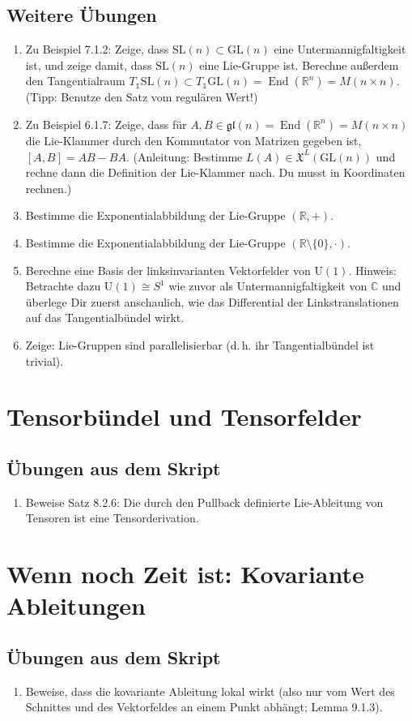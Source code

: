 \documentclass[a4paper,headsepline,headheight=30pt,numbers=enddot]{scrartcl}
\DeclareMathOperator{\End}{End}
\newcommand{\R}{\mathbb{R}}
\newcommand{\vf}{\mathfrak{X}}
\begin{document}
	\subsection*{Weitere Übungen}
	\begin{enumerate}
		\item Zu Beispiel 7.1.2: Zeige, dass $\mathrm{SL}(n) \subset \mathrm{GL}(n)$ eine Untermannigfaltigkeit ist, und zeige damit, dass $\mathrm{SL}(n)$ eine Lie-Gruppe ist. Berechne außerdem den Tangentialraum $T_\mathds{1}\mathrm{SL}(n) \subset T_\mathds{1}\mathrm{GL}(n) = \End(\R^n) = M(n\times n)$. (Tipp: Benutze den Satz vom regulären Wert!)
		\item Zu Beispiel 6.1.7: Zeige, dass für $A,B \in \mathfrak{gl}(n) = \End(\R^n) = M(n\times n)$ die Lie-Klammer durch den Kommutator von Matrizen gegeben ist, $[A,B] = AB - BA$. (Anleitung: Bestimme $L(A) \in \vf^L(\mathrm{GL}(n))$ und rechne dann die Definition der Lie-Klammer nach. Du musst in Koordinaten rechnen.)
		\item Bestimme die Exponentialabbildung der Lie-Gruppe $(\R,+)$.
		\item Bestimme die Exponentialabbildung der Lie-Gruppe $(\R\setminus\{0\},\cdot)$.
		\item Berechne eine Basis der linksinvarianten Vektorfelder von $\mathrm{U}(1)$. Hinweis: Betrachte dazu $\mathrm{U}(1)\cong S^1$ wie zuvor als Untermannigfaltigkeit von $\mathbb{C}$ und überlege Dir zuerst anschaulich, wie das Differential der Linkstranslationen auf das Tangentialbündel wirkt.
		\item Zeige: Lie-Gruppen sind parallelisierbar (d.\,h. ihr Tangentialbündel ist trivial).
	\end{enumerate}
	
	\newpage
	\section{Tensorbündel und Tensorfelder}
	\subsection*{Übungen aus dem Skript}
	\begin{enumerate}
		\item Beweise Satz 8.2.6: Die durch den Pullback definierte Lie-Ableitung von Tensoren ist eine Tensorderivation.
	\end{enumerate}

	\section[Kovariante Ableitungen]{Wenn noch Zeit ist: Kovariante Ableitungen}
	\subsection*{Übungen aus dem Skript}
	\begin{enumerate}
		\item Beweise, dass die kovariante Ableitung lokal wirkt (also nur vom Wert des Schnittes und des Vektorfeldes an einem Punkt abhängt; Lemma 9.1.3).
	\end{enumerate}
\end{document}
